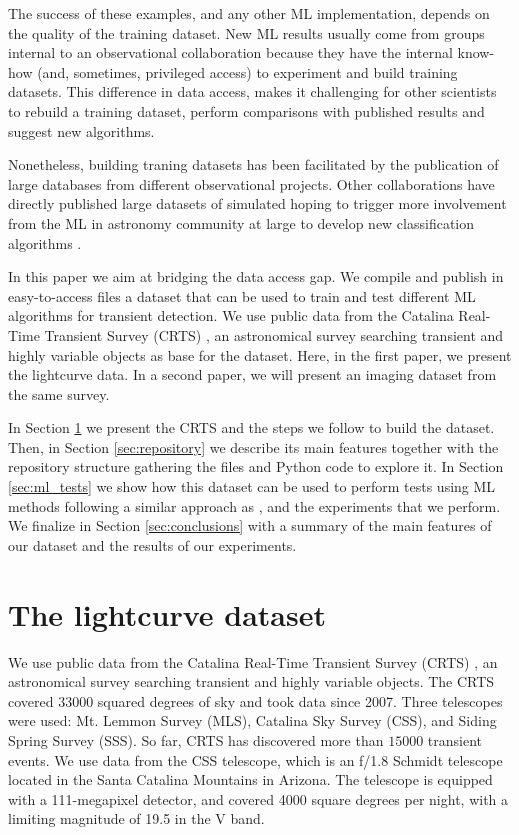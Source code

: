 \documentclass{aastex62}
\begin{document}
The success of these examples, and any other ML implementation,
depends on the quality of the training dataset.
New ML results usually come from groups internal to an observational
collaboration because they have the internal know-how (and, sometimes,
privileged access) to experiment and build training datasets.
This difference in data access, makes it challenging for other
scientists to rebuild a training dataset, perform comparisons with
published results and suggest new algorithms. 

Nonetheless, building traning datasets has been facilitated by the
publication of large databases from different observational projects.
Other collaborations have directly published large datasets of simulated
hoping to trigger more involvement from the ML in astronomy
community at large to develop new classification algorithms \citep{2018arXiv181000001T}.

In this paper we aim at bridging the data access gap.
We compile and publish in easy-to-access files a dataset
that can be used to train and test different ML algorithms for
transient detection. 
We use public data from the Catalina Real-Time Transient Survey
(CRTS) \citep{1111.2566}, an astronomical survey searching transient
and highly variable objects as base for the dataset.
Here, in the first paper, we present the lightcurve data.
In a second paper, we will present an imaging dataset from the same
survey.   

\newpage
In Section \ref{sec:data} we present the CRTS and the steps we follow
to build the dataset.
Then, in Section \ref{sec:repository} we describe its main features together
with the repository structure gathering the files and Python code to explore it. 
In Section \ref{sec:ml_tests} we show how this dataset can be used to 
perform tests using ML methods following a similar approach as \cite{1601.03931},
and the experiments that we perform. 
We finalize in Section \ref{sec:conclusions} with a summary of the
main features of our dataset and the results of our experiments. 


\section{The lightcurve dataset} 
\label{sec:data}

We use public data from the Catalina Real-Time Transient Survey
(CRTS) \citep{2009ApJ...696..870D}, an astronomical survey searching transient
and highly variable objects.
The CRTS covered 33000 squared degrees of sky and took data since 2007. 
Three telescopes were used: Mt. Lemmon Survey (MLS), Catalina Sky 
Survey (CSS), and Siding Spring Survey (SSS). So far, CRTS has 
discovered more than $15000$ transient events.
We use data from the CSS telescope, which is an f/1.8 Schmidt
telescope located in the Santa Catalina Mountains in Arizona.
The telescope is equipped with a 111-megapixel  detector, and covered
4000 square degrees per night, with a limiting magnitude of 19.5 in
the V band.  
\end{document}
